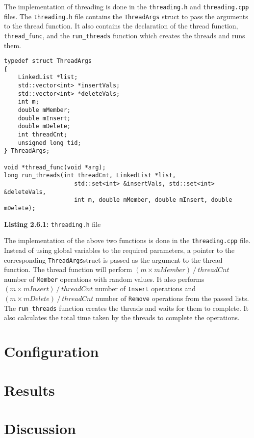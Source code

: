 \documentclass[a4paper,12pt]{article}
\begin{document}
The implementation of threading is done in the \lstinline|threading.h| and \lstinline|threading.cpp| files. The \lstinline|threading.h| file contains the \lstinline|ThreadArgs| struct to pass the arguments to the thread function. It also contains the declaration of the thread function, \lstinline|thread_func|, and the \lstinline|run_threads| function which creates the threads and runs them.

\begin{lstlisting}
typedef struct ThreadArgs
{
    LinkedList *list;
    std::vector<int> *insertVals;
    std::vector<int> *deleteVals;
    int m;
    double mMember;
    double mInsert;
    double mDelete;
    int threadCnt;
    unsigned long tid;
} ThreadArgs;

void *thread_func(void *arg);
long run_threads(int threadCnt, LinkedList *list,
                    std::set<int> &insertVals, std::set<int> &deleteVals,
                    int m, double mMember, double mInsert, double mDelete);
\end{lstlisting}
\begin{center}
    \textbf{Listing 2.6.1:} \lstinline|threading.h| file
\end{center}

The implementation of the above two functions is done in the \lstinline|threading.cpp| file. Instead of using global variables to the required parameters, a pointer to the corresponding \lstinline|ThreadArgs|struct is passed as the argument to the thread function. The thread function will perform \( (m \times mMember)\ /\ threadCnt \) number of \lstinline|Member| operations with random values. It also performs \( (m \times mInsert)\ /\ threadCnt \) number of \lstinline|Insert| operations and \( (m \times mDelete)\ /\ threadCnt \) number of \lstinline|Remove| operations from the passed lists. The \lstinline|run_threads| function creates the threads and waits for them to complete. It also calculates the total time taken by the threads to complete the operations.

\section{Configuration}

\section{Results}

\section{Discussion}
\end{document}
